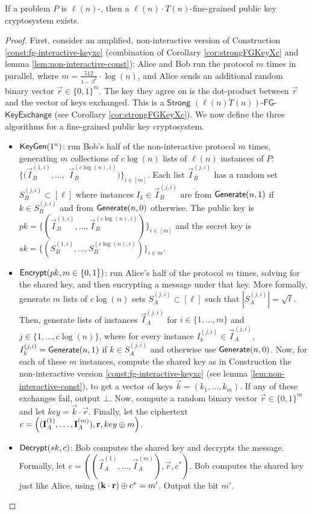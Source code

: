 \begin{theorem}
	 If a problem $P$ is $\ell(n)$-\keyER, then a $\ell(n) \cdot T(n)$-fine-grained public key cryptosystem exists.
\end{theorem}
\begin{proof}
	First, consider an amplified, non-interactive version of Construction \ref{const:fg-interactive-keyxc} (combination of Corollary \ref{cor:strongFGKeyXc} and lemma \ref{lem:non-interactive-const}): Alice and Bob run the protocol $m$ times in parallel, where $m =  \frac{512}{1 - \beta^2} \cdot \log(n)$, and Alice sends an additional random binary vector $\vec r \in \{0,1\}^m$. The key they agree on is the dot-product between $\vec r$ and the vector of keys exchanged. This is a $\textsf{Strong}$ $(\ell(n)T(n))\textsf{-FG-}$ $\textsf{KeyExchange}$ (see Corollary \ref{cor:strongFGKeyXc}). We now define the three algorithms for a fine-grained public key cryptosystem.
	\begin{itemize}
		\item $\textsf{KeyGen}(1^n)$: run Bob's half of the non-interactive protocol $m$ times, generating $m$ collections of $c\log(n)$ lists of $\ell(n)$ instances of $P$: $\{(\vec I_B^{(1,i)}, \ldots,$ $\vec I_B^{(c\log(n), i)} )\}_{i \in [m]}$. Each list $\vec I_B^{(j,i)}$ has a random set $S_B^{(j,i)} \subset [\ell]$ where instances $I_k \in \vec I_B^{(j,i)}$ are from $\mathsf{Generate}(n,1)$ if $k \in S_B^{(j,i)}$ and from $\mathsf{Generate}(n,0)$ otherwise. The public key is $pk = \{(\vec I_B^{(1,i)}, \ldots, \vec I_B^{(c\log(n), i)} )\}_{i \in [m]}$ and the secret key is $sk = \{(S_B^{(1,i)}, \ldots, S_B^{(c\log(n),i)})\}_{i \in m}$.
		\item $\textsf{Encrypt}(pk, m \in \{0,1\})$: run Alice's half of the protocol $m$ times, solving for the shared key, and then encrypting a message under that key. More formally, generate $m$ lists of $c\log(n)$ sets $S_A^{(j,i)} \subset [\ell]$ such that $|S_A^{(j,i)}| = \sqrt{\ell}$. Then, generate lists of instances $\vec I_A^{(j,i)}$ for $i \in \{1,\ldots, m\}$ and $j \in \{1, \ldots, c\log(n)\}$, where for every instance $I_{k}^{(j,i)} \in \vec I_A^{(j,i)}$, $I_{k}^{(j,i)} = \mathsf{Generate}(n,1)$ if $k \in S_A^{(j,i)}$ and otherwise use $\mathsf{Generate}(n,0)$. Now, for each of these $m$ instances, compute the shared key as in Construction the non-interactive version \ref{const:fg-interactive-keyxc} (see lemma \ref{lem:non-interactive-const}), to get a vector of keys $\vec k = (k_1, \ldots, k_m)$. If any of these exchanges fail, output $\bot$. Now, compute a random binary vector $\vec r \in \{0,1\}^m$ and let $key = \vec k \cdot \vec r$. Finally, let the ciphertext $c = \left((\mathbf I_A^{(1)}, \ldots, \mathbf I_A^{(m)} ), \mathbf r, key \oplus m  \right)$.
		\item $\textsf{Decrypt}(sk, c)$: Bob computes the shared key and decrypts the message. Formally, let $c = \left((\vec I_A^{(1)}, \ldots, \vec I_A^{(m)} ), \vec r, c^*  \right)$. Bob computes the shared key just like Alice, using $(\mathbf k \cdot \mathbf r) \oplus c^* = m'$. Output the bit $m'$.
	\end{itemize}


\end{proof}
